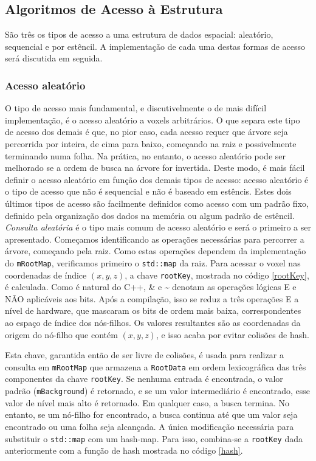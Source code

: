 \documentclass[12pt, a4paper, oneside]{book}
\begin{document}
\subsection{Algoritmos de Acesso à Estrutura}
São três os tipos de acesso a uma estrutura de dados espacial: aleatório, sequencial e por estêncil. A implementação de cada uma destas formas de acesso será discutida em seguida.

\subsubsection{Acesso aleatório}
O tipo de acesso mais fundamental, e discutivelmente o de mais difícil implementação, é o acesso aleatório a voxels arbitrários. O que separa este tipo de acesso dos demais é que, no pior caso, cada acesso requer que árvore seja percorrida por inteira, de cima para baixo, começando na raiz e possivelmente terminando numa folha. Na prática, no entanto, o acesso aleatório pode ser melhorado se a ordem de busca na árvore for invertida. Deste modo, é mais fácil definir o acesso aleatório em função dos demais tipos de acesso: acesso aleatório é o tipo de acesso que não é sequencial e não é baseado em estêncis. Estes dois últimos tipos de acesso são facilmente definidos como acesso com um padrão fixo, definido pela organização dos dados na memória ou algum padrão de estêncil. \\

\emph{Consulta aleatória} é o tipo mais comum de acesso aleatório e será o primeiro a ser apresentado. Começamos identificando as operações necessárias para percorrer a árvore, começando pela raiz. Como estas operações dependem da implementação do \texttt{mRootMap}, verificamos primeiro o \texttt{std::map} da raiz. Para acessar o voxel nas coordenadas de índice $(x, y, z)$, a chave \texttt{rootKey}, mostrada no código \ref{rootKey}, é calculada. Como é natural do C++, \& e \~\; denotam as operações lógicas E e NÃO aplicáveis aos bits. Após a compilação, isso se reduz a três operações E a nível de hardware, que mascaram os bits de ordem mais baixa, correspondentes ao espaço de índice dos nós-filhos. Os valores resultantes são as coordenadas da origem do nó-filho que contém $(x, y, z)$, e isso acaba por evitar colisões de hash. 



Esta chave, garantida então de ser livre de colisões, é usada para realizar a consulta em \texttt{mRootMap} que armazena a \texttt{RootData} em ordem lexicográfica das três componentes da chave \texttt{rootKey}. Se nenhuma entrada é encontrada, o valor padrão (\texttt{mBackground}) é retornado, e se um valor intermediário é encontrado, esse valor de nível mais alto é retornado. Em qualquer caso, a busca termina. No entanto, se um nó-filho for encontrado, a busca continua até que um valor seja encontrado ou uma folha seja alcançada. A única modificação necessária para substituir o \texttt{std::map} com um hash-map. Para isso, combina-se a \texttt{rootKey} dada anteriormente com a função de hash mostrada no código \ref{hash}. \\
\end{document}
